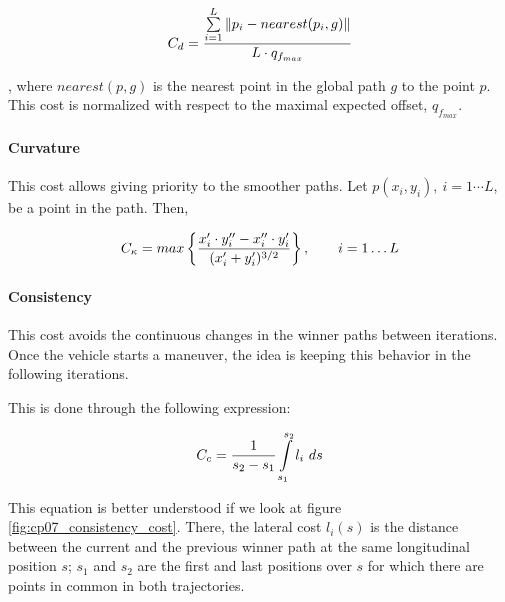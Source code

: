 \begin{equation}\label{eq:cp07_lateral_cost}
C_d = {{\sum\limits_{i=1}^{L}\|p_i - nearest(p_i, g)\|} \over {L \cdot q_{f_{max}}}}
\end{equation}

, where $nearest(p, g)$ is the nearest point in the global path $g$ to the point $p$. This cost is normalized with respect to the maximal expected offset, $q_{f_{max}}$.

\paragraph{Curvature}\label{ch:chapter07_01_04_00_04}

This cost allows giving priority to the smoother paths. Let $p(x_i, y_i), ~ i=1\cdots L$, be a point in the path. Then, 

\begin{equation}\label{eq:cp07_curvature_cost}
C_{\kappa} = max \left \{ {{x_i' \cdot y_i'' - x_i'' \cdot y_i'} \over {(x_i' + y_i')^{3/2}}} \right \}, ~~~~~~ i=1 \dots L
\end{equation}

\paragraph{Consistency}\label{ch:chapter07_01_04_00_05}

This cost avoids the continuous changes in the winner paths between iterations. Once the vehicle starts a maneuver, the idea is keeping this behavior in the following iterations.

This is done through the following expression:

\begin{equation}\label{eq:cp07_consistency_cost}
C_c = {1 \over {s_2 - s_1}} \int \limits_{s_1}^{s_2} l_i ~ ds
\end{equation}

This equation is better understood if we look at figure \ref{fig:cp07_consistency_cost}. There, the lateral cost $l_i(s)$ is the distance between the current and the previous winner path at the same longitudinal position $s$; $s_1$ and $s_2$ are the first and last positions over $s$ for which there are points in common in both trajectories.

